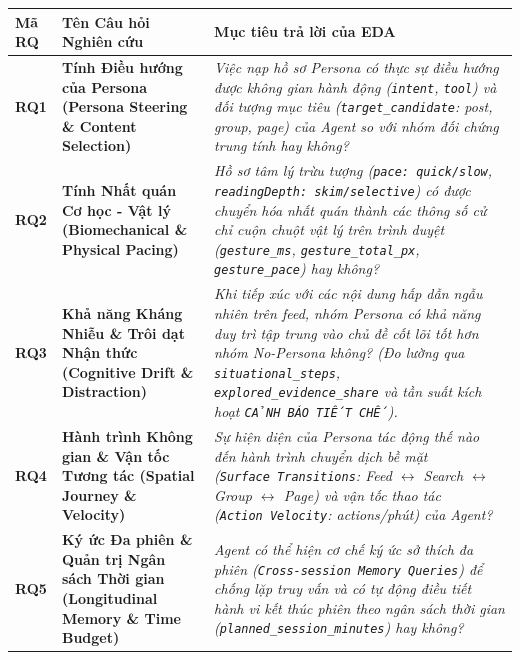 \documentclass[11pt]{article}
\newcounter{none}
\begin{document}
{\def\LTcaptype{none} %
\begin{longtable}[]{@{}
  >{\raggedright\arraybackslash}p{}
  >{\raggedright\arraybackslash}p{}
  >{\raggedright\arraybackslash}p{}@{}}
\toprule\noalign{}
\begin{minipage}[b]{\linewidth}\raggedright
Mã RQ
\end{minipage} & \begin{minipage}[b]{\linewidth}\raggedright
Tên Câu hỏi Nghiên cứu
\end{minipage} & \begin{minipage}[b]{\linewidth}\raggedright
Mục tiêu trả lời của EDA
\end{minipage} \\
\midrule\noalign{}
\endhead
\bottomrule\noalign{}
\endlastfoot
\textbf{RQ1} & \textbf{Tính Điều hướng của Persona (Persona Steering \&
Content Selection)} & \emph{Việc nạp hồ sơ Persona có thực sự điều hướng
được không gian hành động (\texttt{intent}, \texttt{tool}) và đối tượng
mục tiêu (\texttt{target\_candidate}: post, group, page) của Agent so
với nhóm đối chứng trung tính hay không?} \\
\textbf{RQ2} & \textbf{Tính Nhất quán Cơ học - Vật lý (Biomechanical \&
Physical Pacing)} & \emph{Hồ sơ tâm lý trừu tượng
(\texttt{pace:\ quick/slow}, \texttt{readingDepth:\ skim/selective}) có
được chuyển hóa nhất quán thành các thông số cử chỉ cuộn chuột vật lý
trên trình duyệt (\texttt{gesture\_ms}, \texttt{gesture\_total\_px},
\texttt{gesture\_pace}) hay không?} \\
\textbf{RQ3} & \textbf{Khả năng Kháng Nhiễu \& Trôi dạt Nhận thức
(Cognitive Drift \& Distraction)} & \emph{Khi tiếp xúc với các nội dung
hấp dẫn ngẫu nhiên trên feed, nhóm Persona có khả năng duy trì tập trung
vào chủ đề cốt lõi tốt hơn nhóm No-Persona không? (Đo lường qua
\texttt{situational\_steps}, \texttt{explored\_evidence\_share} và tần
suất kích hoạt \texttt{CẢNH\ BÁO\ TIẾT\ CHẾ}).} \\
\textbf{RQ4} & \textbf{Hành trình Không gian \& Vận tốc Tương tác
(Spatial Journey \& Velocity)} & \emph{Sự hiện diện của Persona tác động
thế nào đến hành trình chuyển dịch bề mặt
(\texttt{Surface\ Transitions}: Feed \(\leftrightarrow\) Search
\(\leftrightarrow\) Group \(\leftrightarrow\) Page) và vận tốc thao tác
(\texttt{Action\ Velocity}: actions/phút) của Agent?} \\
\textbf{RQ5} & \textbf{Ký ức Đa phiên \& Quản trị Ngân sách Thời gian
(Longitudinal Memory \& Time Budget)} & \emph{Agent có thể hiện cơ chế
ký ức sở thích đa phiên (\texttt{Cross-session\ Memory\ Queries}) để
chống lặp truy vấn và có tự động điều tiết hành vi kết thúc phiên theo
ngân sách thời gian (\texttt{planned\_session\_minutes}) hay không?} \\
\end{longtable}
}
\end{document}
